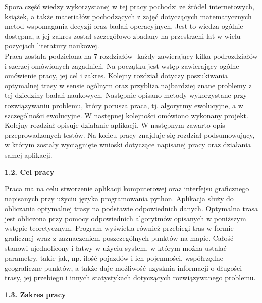 \documentclass[a4paper, twoside, 12pt, justified]{article}
\begin{document}
	
	Spora część wiedzy wykorzystanej w tej pracy pochodzi ze źródeł internetowych, książek, a także materiałów pochodzących z zajęć dotyczących matematycznych metod wspomagania decyzji oraz badań operacyjnych. Jest to wiedza ogólnie dostępna, a jej zakres został szczegółowo zbadany na przestrzeni lat w wielu pozycjach literatury naukowej.\\
	
	Praca została podzielona na 7 rozdziałów- każdy zawierający kilka podrozdziałów i szerzej omówionych zagadnień. Na początku jest wstęp zawierający ogólne omówienie pracy, jej cel i zakres. Kolejny rozdział dotyczy poszukiwania optymalnej trasy w sensie ogólnym oraz przybliża najbardziej znane problemy z tej dziedziny badań naukowych. Następnie opisano metody wykorzystane przy rozwiązywaniu problemu, który porusza praca, tj. algorytmy ewolucyjne, a w szczególności ewolucyjne. W następnej kolejności omówiono wykonany projekt. Kolejny rozdział opisuje działanie aplikacji. W następnym zawarto opis przeprowadzonych testów. Na końcu pracy znajduje się rozdział podsumowujący, w którym zostały wyciągnięte wnioski dotyczące napisanej pracy oraz działania samej aplikacji.
	
	\newpage
	
	\begin{flushleft}
		\begin{large}
			\textbf{1.2. Cel pracy}
		\end{large}
	\end{flushleft}
	\vspace{5mm} %
	
	Praca ma na celu stworzenie aplikacji komputerowej oraz interfejsu graficznego napisanych przy użyciu języka programowania python. Aplikacja służy do obliczania optymalnej trasy na podstawie odpowiednich danych. Optymalna trasa jest obliczona przy pomocy odpowiednich algorytmów opisanych w poniższym wstępie teoretycznym. Program wyświetla również przebiegi tras w formie graficznej wraz z zaznaczeniem poszczególnych punktów na mapie. Całość stanowi ujednolicony i łatwy w użyciu system, w którym można ustalać parametry, takie jak, np. ilość pojazdów i ich pojemności, współrzędne geograficzne punktów, a także daje możliwość uzysknia informacji o długości trasy, jej przebiegu i innych statystykach dotyczących rozwiązywanego problemu.  
	\vspace{5mm} %
	
	\begin{flushleft}
		\begin{large}
			\textbf{1.3. Zakres pracy}
		\end{large}
	\end{flushleft}
	\vspace{5mm} %
	
\end{document}
